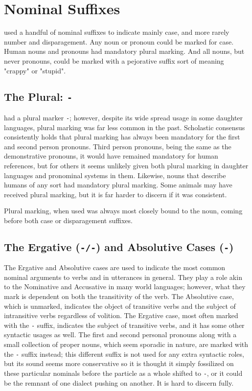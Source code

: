\section{Nominal Suffixes}
\langname used a handful of nominal suffixes to indicate mainly case, and more rarely number and disparagement. Any noun or pronoun could be marked for case. Human nouns and pronouns had mandatory plural marking. And all nouns, but never pronouns, could be marked with a pejorative suffix sort of meaning "crappy" or "stupid".\par

\subsection{The Plural: \texttt{-\plural}}
\langname had a plural marker \texttt{-\plural}; however, despite its wide spread usage in some daughter languages, plural marking was far less common in the past. Scholastic consensus consistently holds that plural marking has always been mandatory for the first and second person pronouns. Third person pronouns, being the same as the demonstrative pronouns, it would have remained mandatory for human references, but for others it seems unlikely given both plural marking in daughter languages and pronominal systems in them. Likewise, nouns that describe humans of any sort had mandatory plural marking. Some animals may have received plural marking, but it is far harder to discern if it was consistent.\par
Plural marking, when used was always most closely bound to the noun, coming before both case or disparagement suffixes.\par

\subsection{The Ergative (\texttt{-\erg/-\ergold}) and Absolutive Cases (\texttt{-\varnothing})}
The Ergative and Absolutive cases are used to indicate the most common nominal arguments to verbs and in utterances in general. They play a role akin to the Nominative and Accusative in many world languages; however, what they mark is dependent on both the transitivity of the verb. The Absolutive case, which is unmarked, indicates the object of transitive verbs and the subject of intransitive verbs regardless of volition. The Ergative case, most often marked with the \texttt{-\erg} suffix, indicates the subject of transitive verbs, and it has some other syntactic usages as well. The first and second personal pronouns along with a small collection of proper nouns, which seem sporadic in nature, are marked with the \texttt{-\ergold} suffix instead; this different suffix is not used for any extra syntactic roles, but its sound seems more conservative so it is thought it simply fossilized on these particular nominals before the particle as a whole shifted to \texttt{-\erg}, or it could be the remnant of one dialect pushing on another. It is hard to discern fully.
